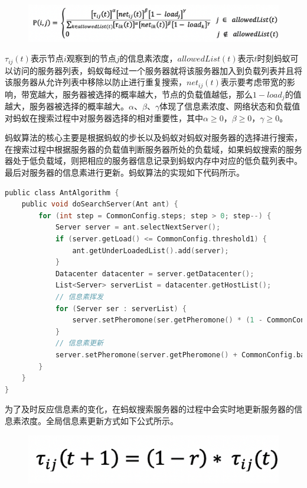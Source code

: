 \begin{figure}[htb]
  \centering
  \includegraphics[width=0.85\linewidth]{./Figure/IMG_Chap3_5.png}
\end{figure}

$ \tau_{ij} (t) $表示节点$ i $观察到的节点$ j $的信息素浓度，$allowedList(t) $表示$ t $时刻蚂蚁可以访问的服务器列表，蚂蚁每经过一个服务器就将该服务器加入到负载列表并且将该服务器从允许列表中移除以防止进行重复搜索，$net_{ij} (t) $表示要考虑带宽的影响，带宽越大，服务器被选择的概率越大，节点的负载值越低，那么$ 1 - load_j $的值越大，服务器被选择的概率越大。$ \alpha $、$ \beta $、$ \gamma $体现了信息素浓度、网络状态和负载值对蚂蚁在搜索过程中对服务器选择的相对重要性，其中$ \alpha ≥ 0 $，$ \beta ≥ 0 $，$ \gamma ≥ 0 $。

蚂蚁算法的核心主要是根据蚂蚁的步长以及蚂蚁对蚂蚁对服务器的选择进行搜索，在搜索过程中根据服务器的负载值判断服务器所处的负载域，如果蚂蚁搜索的服务器处于低负载域，则把相应的服务器信息记录到蚂蚁内存中对应的低负载列表中。最后对服务器的信息素进行更新。蚂蚁算法的实现如下代码所示。

\begin{lstlisting}[language=C,caption={蚂蚁算法},label=Code:java]
public class AntAlgorithm {
    public void doSearchServer(Ant ant) {
        for (int step = CommonConfig.steps; step > 0; step--) {
            Server server = ant.selectNextServer();
            if (server.getLoad() <= CommonConfig.threshold1) {
                ant.getUnderLoadedList().add(server);
            }
            Datacenter datacenter = server.getDatacenter();
            List<Server> serverList = datacenter.getHostList();
            // 信息素挥发
            for (Server ser : serverList) {
                server.setPheromone(ser.getPheromone() * (1 - CommonConfig.rate));
            }
            // 信息素更新
            server.setPheromone(server.getPheromone() + CommonConfig.base * (1 - server.getLoad()));
        }
    }
}
\end{lstlisting}

为了及时反应信息素的变化，在蚂蚁搜索服务器的过程中会实时地更新服务器的信息素浓度。全局信息素更新方式如下公式所示。

\begin{figure}[htb]
  \centering
  \includegraphics[width=0.3\linewidth]{./Figure/IMG_Chap3_6.png}
\end{figure}

